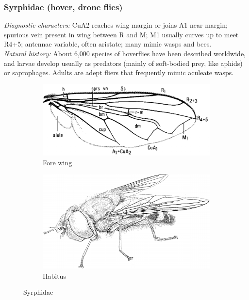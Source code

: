 \documentclass[letterpaper, 11pt]{article}
\begin{document}
\subsubsection{Syrphidae (hover, drone flies)}
\noindent{}\textit{Diagnostic characters:} CuA2 reaches wing margin or joins A1 near margin; spurious vein present in wing between R and M; M1 usually curves up to meet R4+5; antennae variable, often aristate; many mimic wasps and bees.\\

\noindent{}\textit{Natural history:} About 6,000 species of hoverflies have been described worldwide, and larvae develop usually as predators (mainly of soft-bodied prey, like aphids) or saprophages. Adults are adept fliers that frequently mimic aculeate wasps.

\begin{figure}[ht!]
    \centering
    \begin{subfigure}[ht!]{0.45\textwidth}
        \includegraphics[width=\textwidth]{SyrphidWing}
        \caption{Fore wing \citep[][Fig. 52.52]{mcalpine1981manualv2}}
        \label{fig:syrphid2}
    \end{subfigure}
    \qquad 
    \begin{subfigure}[ht!]{0.45\textwidth}
        \includegraphics[width=\textwidth]{SyrphidHabitus}
        \caption{Habitus \citep[][Fig. 52.1]{mcalpine1981manualv2}}
        \label{fig:syrpidh1}
    \end{subfigure}
    \caption{Syrphidae}\label{fig:syrphids}
\end{figure}
\end{document}
